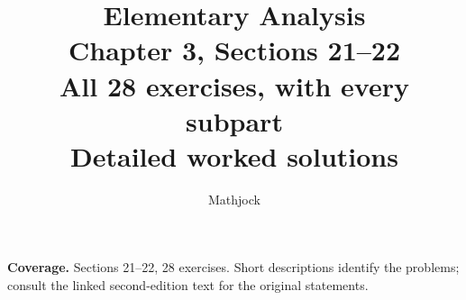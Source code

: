 
\title{\textbf{Elementary Analysis}\\[0.3em]
Chapter 3, Sections 21--22\\[0.4em]
\large All 28 exercises, with every subpart\\
Detailed worked solutions}
\author{Mathjock}
\date{}

\maketitle
\bookinfo
\par\textbf{Coverage.} Sections 21--22, 28 exercises. Short descriptions identify the problems; consult the linked second-edition text for the original statements.
\tableofcontents
\clearpage
\setcounter{section}{20}

\clearpage



